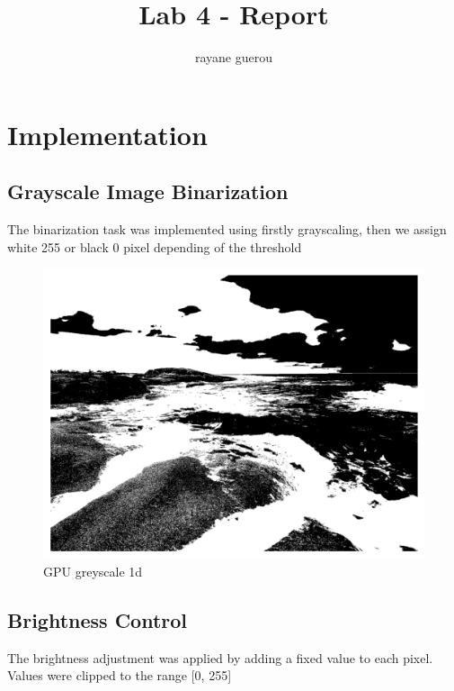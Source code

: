 \documentclass[a4paper]{article}
\title{Lab 4 - Report}
\author{rayane guerou}
\begin{document}
\maketitle


\section{Implementation}
\subsection{Grayscale Image Binarization}
The binarization task was implemented using firstly grayscaling, then we assign white 255 or black 0 pixel depending of the threshold

\begin{figure}[ht!]
    \centering
    \includegraphics[scale=0.5]{../src/treshold.png}
    \caption{GPU greyscale 1d}
\end{figure}

\subsection{Brightness Control}
The brightness adjustment was applied by adding a fixed value to each pixel. Values were clipped to the range [0, 255]
\end{document}
